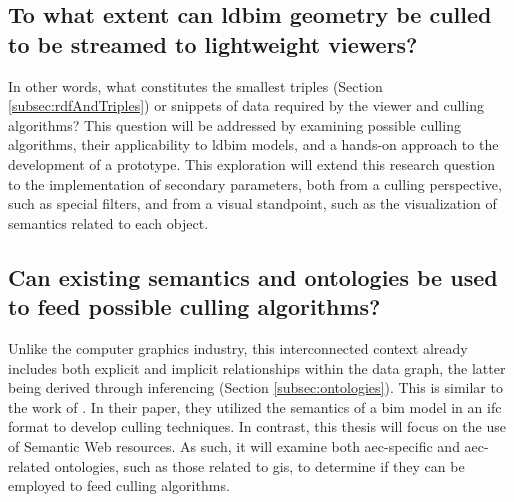\subsection[Can \acs{ldbim} be culled?]{To what extent can \acs{ldbim} geometry be culled \\
	to be streamed to lightweight viewers?} \label{subsec:rq1}
In other words, what constitutes the smallest triples (Section \ref{subsec:rdfAndTriples}) or snippets of data required by the viewer and culling algorithms? This question will be addressed by examining possible culling algorithms, their applicability to \ac{ldbim} models, and a hands-on approach to the development of a prototype. This exploration will extend this research question to the implementation of secondary parameters, both from a culling perspective, such as special filters, and from a visual standpoint, such as the visualization of semantics related to each object.

\subsection[Can existing semantics be used?]{Can existing semantics and ontologies be used\\
	to feed possible culling algorithms?}\label{subsec:rq2}
Unlike the computer graphics industry, this interconnected context already includes both explicit and implicit relationships within the data graph, the latter being derived through inferencing (Section \ref{subsec:ontologies}). This is similar to the work of \cite{Johansson2009}. In their paper, they utilized the semantics of a \ac{bim} model in an \ac{ifc} format to develop culling techniques. In contrast, this thesis will focus on the use of Semantic Web resources. As such, it will examine both \ac{aec}-specific and \ac{aec}-related ontologies, such as those related to \ac{gis}, to determine if they can be employed to feed culling algorithms.

